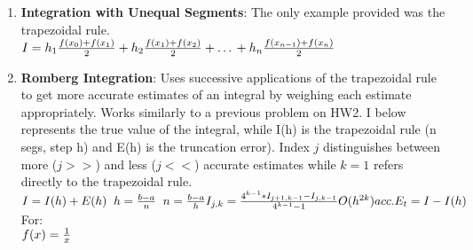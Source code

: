 \documentclass[fontsize=5pt]{scrartcl}
\begin{document}
\begin{multicols}{3}
\begin{enumerate}
      
      \item \textbf{Integration with Unequal Segments}: The only example provided was the trapezoidal rule. \\
        \begin{math}
          I=h_1\frac{f(x_0)+f(x_1)}{2}+h_2\frac{f(x_1)+f(x_2)}{2}+\ldots \\
          +h_n\frac{f(x_{n-1})+f(x_{n})}{2}
        \end{math}

      \item \textbf{Romberg Integration}: Uses successive applications of the trapezoidal rule to get more accurate
        estimates of an integral by weighing each estimate appropriately. Works similarly to a previous problem on 
        HW2. I below represents the true value of the integral, while I(h) is the trapezoidal rule (n segs, step h)
        and E(h) is the truncation error). Index $j$ distinguishes between more ($j>>$) and less ($j<<$) accurate 
        estimates while $k=1$ refers directly to the trapezoidal rule.\\
        \begin{math}
          I=I(h)+E(h) \hspace{2mm} h=\frac{b-a}{n} \hspace{2mm} n=\frac{b-a}{h} \\
          I_{j,k}=\frac{4^{k-1}*I_{j+1,k-1} - I_{j,k-1}}{4^{k-1}-1} \\
          O(h^{2k}) acc. \\
          E_t=I-I(h) \\
         \end{math} 
         For:\\
         \begin{math}
           f(x) = \frac{1}{x} \\
         \end{math}


\end{enumerate}
\end{multicols}
\end{document}
